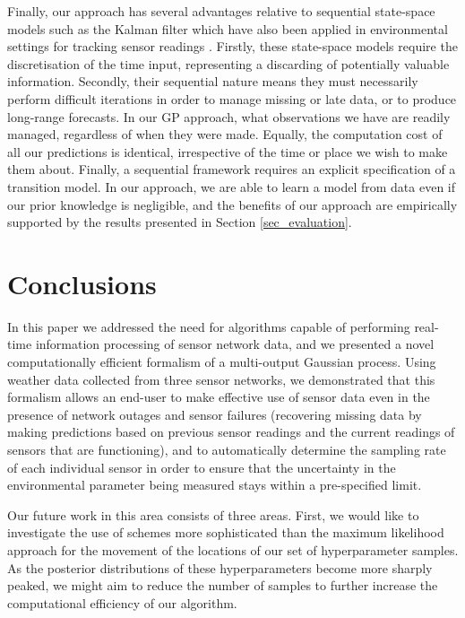 \documentclass{acmtrans2m}
\begin{document}
Finally, our approach has several advantages relative to sequential state-space models such as the Kalman filter \cite{Girard,Jazwinski} which have also been applied in environmental settings for tracking sensor readings \cite{kalman_oceanography}. Firstly, these state-space models require the discretisation of the time input, representing a discarding of potentially valuable information. Secondly, their sequential nature means they must necessarily perform difficult iterations in order to manage missing or late data, or to produce long-range forecasts. In our GP approach, what observations we have are readily managed, regardless of when they were made. Equally, the computation cost of all our predictions is identical, irrespective of the time or place we wish to make them about. Finally, a sequential framework requires an explicit specification of a transition model. In our approach, we are able to learn a model from data even if our prior knowledge is negligible, and the benefits of our approach are empirically supported by the results presented in Section \ref{sec_evaluation}.

\section{Conclusions}\label{sec_conclusion}

\noindent In this paper we addressed the need for algorithms capable of performing real-time information processing of sensor network data, and we presented a novel computationally efficient formalism of a multi-output Gaussian process. Using weather data collected from three sensor networks, we demonstrated that this formalism allows an end-user to make effective use of sensor data even in the presence of network outages and sensor failures (recovering missing data by making predictions based on previous sensor readings and the current readings of sensors that are functioning), and to automatically determine the sampling rate of each individual sensor in order to ensure that the uncertainty in the environmental parameter being measured stays within a pre-specified limit.

Our future work in this area consists of three areas. First, we would like to investigate the use of schemes more sophisticated than the maximum likelihood approach for the movement of the locations of our set of hyperparameter samples. As the posterior distributions of these hyperparameters become more sharply peaked, we might aim to reduce the number of samples to further increase the computational efficiency of our algorithm.
\end{document}
